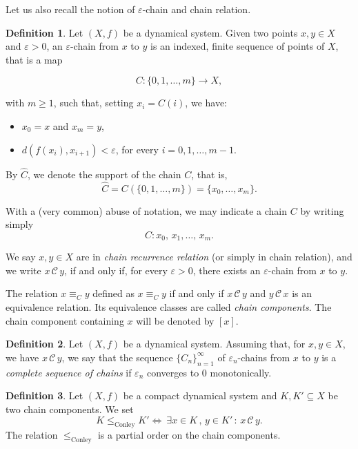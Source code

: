 \documentclass[10pt,a4paper]{article}
\theoremstyle{definition}
\newtheorem{defi}{Definition}[section]
\theoremstyle{remark}
\theoremstyle{plain}
\begin{document}
Let us also recall the notion of $\varepsilon$-chain and chain relation.
\begin{defi}\label{chain}
    Let $(X, f)$ be a dynamical system. Given two points $x, y \in X$ and $\varepsilon > 0$, an $\varepsilon$-chain from $x$ to $y$ is an indexed, finite sequence of points of $X$, that is a map
    
    $$C:\{0,1,\dots,m\}\longrightarrow X,$$
    
    with $m\ge1$, such that, setting $x_i=C(i)$, we have:
    \begin{itemize}
        \item[i)] $x_0 = x$ and $x_m = y$,
        \item[ii)] $d(f(x_i), x_{i+1})<\varepsilon$, for every $i=0,1,\dots,m-1$.
    \end{itemize}
    By $\widehat{C}$, we denote the support of the chain $C$, that is, 
    $$\widehat{C}=C(\{0,1,\dots,m\})=\{x_0,\dots,x_m\}.$$ 
    
    With a (very common) abuse of notation, we may indicate a chain $C$ by writing simply $$C:x_0,\,x_1,\dots,\,x_m.$$



    
    
    We say $x,y \in X$ are in \emph{chain recurrence relation} (or simply in chain relation), and we write $x\,\mathcal{C}\,y$, if and only if, for every $\varepsilon>0$, there exists an $\varepsilon$-chain from $x$ to $y$.
\end{defi}

The relation $x\equiv_C y$ defined as $x\equiv_C y$ if and only if $x\,\mathcal{C}\, y$ and $y\,\mathcal{C}\, x$ is an equivalence relation. Its equivalence classes are called \textit{chain components}. The chain component containing $x$ will be denoted by $[x]$.

\begin{defi}\label{compchain}
    Let $(X,f)$ be a dynamical system.
    Assuming that, for $x,y\in X$, we have $x\,\mathcal{C}\,y$, we say that the sequence $\{C_n\}_{n=1}^\infty$ of $\varepsilon_n$-chains from $x$ to $y$ is a \emph{complete sequence of chains} if $\varepsilon_n$ converges to 0 monotonically.
\end{defi}

\begin{defi}
    Let $(X,f)$ be a compact dynamical system and $K,K'\subseteq X$ be two chain components. We set $$K\le_{\mathrm{Conley}}K'\iff \ \exists x \in K\,,\,y\in K'\,:\, x\,\mathcal{C}\,y.$$ 
    The relation $\le_{\mathrm{Conley}}$ is a partial order on the chain components.
\end{defi}
\end{document}
